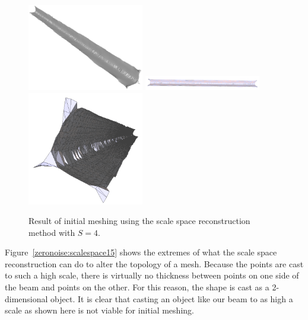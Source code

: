 \documentclass[12pt]{drexelthesis}
\begin{document}
\begin{figure}[!ht]
	\centering
		\includegraphics[width=2in]{simulated-lab-scan/0noise/clean/scalespace400.png}
		\includegraphics[width=2in]{simulated-lab-scan/0noise/clean/scalespace401.png}
		\includegraphics[width=2in]{simulated-lab-scan/0noise/clean/scalespace402.png}
		\caption[Initial meshing using a scale space reconstruction with $S = 4$]{\centering  Result of initial meshing using the scale space reconstruction method with $S = 4$.}
		\label{zeronoise:scalespace4}
\end{figure}

Figure~\ref{zeronoise:scalespace15} shows the extremes of what the scale space reconstruction can do to alter the topology of a mesh. Because the points are cast to such a high scale, there is virtually no thickness between points on one side of the beam and points on the other. For this reason, the shape is cast as a 2-dimensional object. It is clear that casting an object like our beam to as high a scale as shown here is not viable for initial meshing. 
\end{document}
